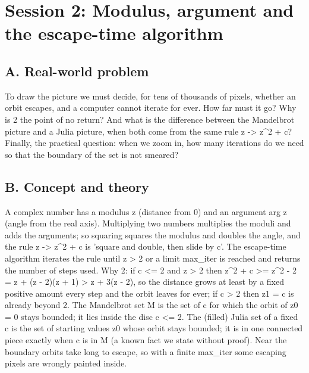 \documentclass[11pt,a4paper]{article}
\begin{document}
\section{Session 2: Modulus, argument and the escape-time algorithm}

\subsection*{A. Real-world problem}
To draw the picture we must decide, for tens of thousands of pixels, whether an orbit escapes, and a computer cannot iterate for ever. How far must it go? Why is 2 the point of no return? And what is the difference between the Mandelbrot picture and a Julia picture, when both come from the same rule z -\textgreater{} z\textasciicircum{}2 + c? Finally, the practical question: when we zoom in, how many iterations do we need so that the boundary of the set is not smeared?

\subsection*{B. Concept and theory}
A complex number has a modulus \textbar{}z\textbar{} (distance from 0) and an argument arg z (angle from the real axis). Multiplying two numbers multiplies the moduli and adds the arguments; so squaring squares the modulus and doubles the angle, and the rule z -\textgreater{} z\textasciicircum{}2 + c is 'square and double, then slide by c'. The escape-time algorithm iterates the rule until \textbar{}z\textbar{} \textgreater{} 2 or a limit max\_iter is reached and returns the number of steps used. Why 2: if \textbar{}c\textbar{} \textless{}= 2 and \textbar{}z\textbar{} \textgreater{} 2 then \textbar{}z\textasciicircum{}2 + c\textbar{} \textgreater{}= \textbar{}z\textbar{}\textasciicircum{}2 - 2 = \textbar{}z\textbar{} + (\textbar{}z\textbar{} - 2)(\textbar{}z\textbar{} + 1) \textgreater{} \textbar{}z\textbar{} + 3(\textbar{}z\textbar{} - 2), so the distance grows at least by a fixed positive amount every step and the orbit leaves for ever; if \textbar{}c\textbar{} \textgreater{} 2 then z1 = c is already beyond 2. The Mandelbrot set M is the set of c for which the orbit of z0 = 0 stays bounded; it lies inside the disc \textbar{}c\textbar{} \textless{}= 2. The (filled) Julia set of a fixed c is the set of starting values z0 whose orbit stays bounded; it is in one connected piece exactly when c is in M (a known fact we state without proof). Near the boundary orbits take long to escape, so with a finite max\_iter some escaping pixels are wrongly painted inside.
\end{document}
